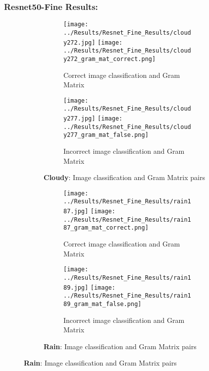 \documentclass{article}
\begin{document}
\subsubsection{Resnet50-Fine Results:}
\begin{figure}[H]
    \centering
    \begin{subfigure}{\linewidth}
        \centering
        \begin{subfigure}{0.49\linewidth}
            \centering
            \texttt{[image: ../Results/Resnet\_Fine\_Results/cloudy272.jpg]}
            \texttt{[image: ../Results/Resnet\_Fine\_Results/cloudy272\_gram\_mat\_correct.png]}
            \caption*{Correct image classification and Gram Matrix}
        \end{subfigure}
        \begin{subfigure}{0.49\linewidth}
            \centering
            \texttt{[image: ../Results/Resnet\_Fine\_Results/cloudy277.jpg]}
            \texttt{[image: ../Results/Resnet\_Fine\_Results/cloudy277\_gram\_mat\_false.png]}
            \caption*{Incorrect image classification and Gram Matrix}
        \end{subfigure}
        \caption*{\textbf{Cloudy}: Image classification and Gram Matrix pairs}
    \end{subfigure}
    \hfill

    \begin{subfigure}{\linewidth}
        \centering
        \begin{subfigure}{0.49\linewidth}
            \centering
            \texttt{[image: ../Results/Resnet\_Fine\_Results/rain187.jpg]}
            \texttt{[image: ../Results/Resnet\_Fine\_Results/rain187\_gram\_mat\_correct.png]}
            \caption*{Correct image classification and Gram Matrix}
        \end{subfigure}
        \begin{subfigure}{0.49\linewidth}
            \centering
            \texttt{[image: ../Results/Resnet\_Fine\_Results/rain189.jpg]}
            \texttt{[image: ../Results/Resnet\_Fine\_Results/rain189\_gram\_mat\_false.png]}
            \caption*{Incorrect image classification and Gram Matrix}
        \end{subfigure}
        \caption*{\textbf{Rain}: Image classification and Gram Matrix pairs}
    \end{subfigure}
    \hfill


\end{figure}
\end{document}
